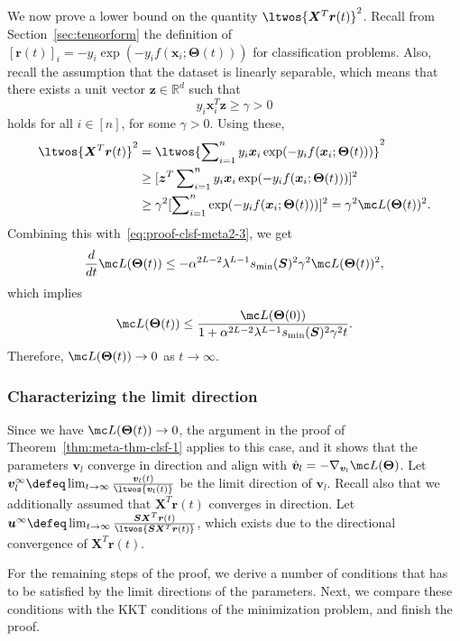 \documentclass{article} %
\def\vr{{\bm{r}}}
\def\vu{{\bm{u}}}
\def\vv{{\bm{v}}}
\def\vx{{\bm{x}}}
\def\vz{{\bm{z}}}
\def\mS{{\bm{S}}}
\def\mX{{\bm{X}}}
\newcommand{\R}{\mathbb{R}}
\newcommand{\bTheta}{\bm{\Theta}}
\begin{document}
We now prove a lower bound on the quantity $\ltwos{\mX^T \vr(t)}^2$. Recall from Section~\ref{sec:tensorform} the definition of $[\vr(t)]_i = -y_i \exp(-y_i f(\vx_i;\bTheta(t)))$ for classification problems. Also, recall the assumption that the dataset is linearly separable, which means that there exists a unit vector $\vz \in \R^d$ such that
\begin{equation*}
    y_i \vx_i^T \vz \geq \gamma > 0
\end{equation*}
holds for all $i \in [n]$, for some $\gamma > 0$.
Using these,
\begin{align*}
    \ltwos{\mX^T \vr(t)}^2 
    &= \ltwos{\sum\nolimits_{i=1}^n y_i \vx_i \exp(-y_i f(\vx_i;\bTheta(t)))}^2 \\
    &\geq [\vz^T \sum\nolimits_{i=1}^n y_i \vx_i \exp(-y_i f(\vx_i;\bTheta(t)))]^2\\
    &\geq \gamma^2 [\sum\nolimits_{i=1}^n \exp(-y_i f(\vx_i;\bTheta(t)))]^2
    = \gamma^2 \mc L(\bTheta(t))^2.
\end{align*}
Combining this with~\eqref{eq:proof-clsf-meta2-3}, we get
\begin{equation*}
    \frac{d}{dt} \mc L(\bTheta(t)) \leq - \alpha^{2L-2} \lambda^{L-1} s_{\min}(\mS)^2 \gamma^2 \mc L(\bTheta(t))^2,
\end{equation*}
which implies
\begin{equation*}
    \mc L(\bTheta(t)) \leq 
    \frac{\mc L(\bTheta(0))}{1+\alpha^{2L-2} \lambda^{L-1} s_{\min}(\mS)^2 \gamma^2 t}.
\end{equation*}
Therefore, $\mc L(\bTheta(t)) \to 0$ as $t \to \infty$.

\subsubsection{Characterizing the limit direction}
Since we have $\mc L(\bTheta(t)) \to 0$, the argument in the proof of Theorem~\ref{thm:meta-thm-clsf-1} applies to this case, and it shows that the parameters $\vv_l$ converge in direction and align with $\dot \vv_l = -\nabla_{\vv_l} \mc L(\bTheta)$.
Let $\vv_l^\infty \defeq \lim_{t \to \infty} \frac{\vv_l(t)}{\ltwos{\vv_l(t)}}$ be the limit direction of $\vv_l$.
Recall also that we additionally assumed that $\mX^T \vr(t)$ converges in direction. Let $\vu^\infty \defeq \lim_{t \to \infty} \frac{\mS \mX^T \vr(t)}{\ltwos{\mS \mX^T \vr(t)}}$, which exists due to the directional convergence of $\mX^T \vr(t)$.

For the remaining steps of the proof, we derive a number of conditions that has to be satisfied by the limit directions of the parameters. Next, we compare these conditions with the KKT conditions of the minimization problem, and finish the proof.
\end{document}
